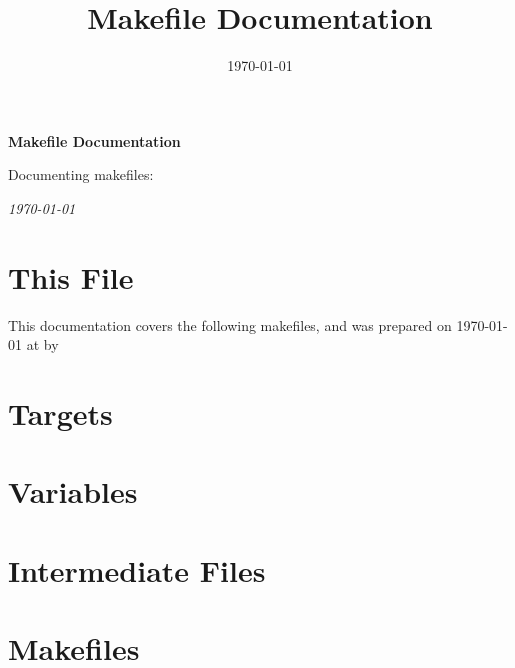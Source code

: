 \documentclass[oneside,11pt]{memoir}
\title{Makefile Documentation}
\date{\today}
\author{}
\begin{document}
	
	\begin{center}
		{\Huge \textbf{Makefile Documentation}}
		
		{\large Documenting makefiles: \texttt{} }
		
		\textit{\today}
	\end{center}
	
	\tableofcontents*
	
	\section{This File}
	\label{intro}
	
	This documentation covers the following makefiles, and was prepared on \today{} at \currenttime{} by \texttt{}
	
	\begin{description}
		
	\end{description}
	
	\begin{center}
	\end{center}
	
	\section{Targets}
	\label{targets}
	
	
	\section{Variables}
	\label{variables}
			
	
	\section{Intermediate Files}
	\label{intermediates}

	\begin{description}		
						
	\end{description}
	
	\newpage
	\section{Makefiles}
	\label{makefiles}
		
		
	


	
\end{document}
